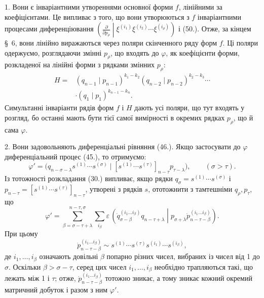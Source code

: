 \documentclass[11pt]{article}
\newcommand{\pair}[2]{\left(#1\middle|#2\right)}
\newcommand{\eps}{\varepsilon}
\begin{document}
1. Вони є інваріантними утвореннями основної форми $f$, лінійними за коефіцієнтами. Це випливає з того, що вони утворюються з $f$ інваріантними процесами диференціювання
$\left(\frac{\partial}{\partial p_\rho}\middle|\xi^{(i_1)}\xi^{(i_2)}\cdots\xi^{(i_\rho)}\right)$ і (50.). Отже, за кінцем \S\ 6, вони лінійно виражаються через поляри скінченного ряду форм $f$. Ці поляри одержуємо, розглядаючи змінні $p_\rho$, що входять до $\varphi$, як коефіцієнти форми, розкладеної на лінійні форми з рядками змінних $p_\rho$:
\begin{equation}
\begin{aligned}
 H={}&(q_{n-1}\mid p_{n-1})^{k_1-k_2}
(q_{n-2}\mid p_{n-2})^{k_2-k_3}\cdots\\
&\cdot(q_1\mid p_1)^{k_{n-1}-k_n}.
\end{aligned}
\tag{52}
\end{equation}
Симультанні інваріанти рядів форм $f$ і $H$ дають усі поляри, що тут входять у розгляд, бо останні мають бути тієї самої вимірності в окремих рядках $p_\rho$, що й сама $\varphi$.

2. Вони задовольняють диференціальні рівняння (46.). Якщо застосувати до $\varphi$ диференціальний процес (45.), то отримуємо:
\[
 \varphi'=\bigl(q_{n-\sigma-\lambda}s^{(1)}\cdots s^{(\sigma)}\mid [s^{(1)}\cdots s^{(\tau)}]_{n-\tau}p_{\tau-\lambda}\bigr),\qquad (\sigma>\tau).
\]
Із тотожності розкладання (30.) випливає, якщо рядки $q_\sigma=s^{(1)}\cdots s^{(\sigma)}$ і $p_{n-\tau}=[s^{(1)}\cdots s^{(\tau)}]_{n-\tau}$, утворені з рядків $s$, ототожнити з тамтешніми $q_\rho,p_\tau$, що
\[
 \varphi'=\sum_{\beta=\sigma-\tau+\lambda}^{n-\tau,\sigma}\sum_{i_\beta}\eps\,
 \pair{\dot{q}_{\sigma-\beta}^{(i_1\ldots i_\beta)}q_{n-\tau+\lambda}}{p_{\sigma+\lambda}\dot{p}_{n-\tau-\beta}^{(i_1\ldots i_\beta)}}.
\]
При цьому
\[
 \dot{p}_{n-\tau-\beta}^{(i_1\ldots i_\beta)}\sim s^{(1)}\cdots s^{(\tau)}s^{(i_1)}\cdots s^{(i_\beta)},
\]
де $i_1,\ldots,i_\beta$ означають довільні $\beta$ попарно різних чисел, вибраних із чисел від 1 до $\sigma$. Оскільки $\beta>\sigma-\tau$, серед цих чисел $i_1,\ldots,i_\beta$ необхідно трапляються такі, що лежать між 1 і $\tau$; отже, $\dot{p}_{n-\tau-\beta}^{(i_1\ldots i_\beta)}$ тотожно зникає, а тому зникає кожний окремий матричний добуток і разом з ним $\varphi'$.
\end{document}
